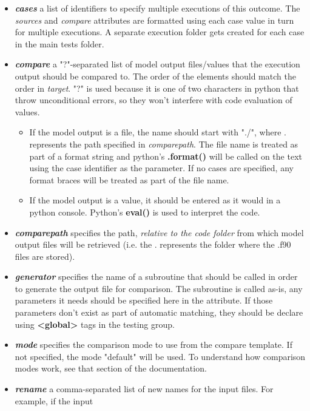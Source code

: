 \documentclass[paper=a4, fontsize=11pt]{scrartcl} %
\numberwithin{equation}{section} %
\numberwithin{figure}{section} %
\numberwithin{table}{section} %
\begin{document}
\begin{itemize}
\item \textbf{\textit{cases}} a list of identifiers to specify multiple executions of this outcome. The \textit{sources}
and \textit{compare} attributes are formatted using each case value in turn for multiple executions. A separate
execution folder gets created for each case in the main tests folder.
\item \textbf{\textit{compare}} a "?"-separated list of model output files/values that the execution output should be
compared to. The order of the elements should match the order in \textit{target}. "?" is used because it is one of
two characters in python that throw unconditional errors, so they won't interfere with code evaluation of values.
  \begin{itemize}
  \item If the model output is a file, the name should start with "./", where . represents the path specified
  in \textit{comparepath}. The file name is treated as part of a format string and python's \textbf{.format()}
  will be called on the text using the case identifier as the parameter. If no cases are specified, any
  format braces will be treated as part of the file name.
  \item If the model output is a value, it should be entered as it would in a python console. Python's
  \textbf{eval()} is used to interpret the code.
  \end{itemize}
\item \textbf{\textit{comparepath}} specifies the path, \textit{relative to the code folder} from which model output
files will be retrieved (i.e. the . represents the folder where the .f90 files are stored).
\item \textbf{\textit{generator}} specifies the name of a subroutine that should be called in order to generate the
output file for comparison. The subroutine is called as-is, any parameters it needs should be specified
here in the attribute. If those parameters don't exist as part of automatic matching, they should be declare
using \textbf{<global>} tags in the testing group.
\item \textbf{\textit{mode}} specifies the comparison mode to use from the compare template. If not specified, the mode
"default" will be used. To understand how comparison modes work, see that section of the documentation.
\item \textbf{\textit{rename}} a comma-separated list of new names for the input files. For example, if the input

\end{itemize}
\end{document}
